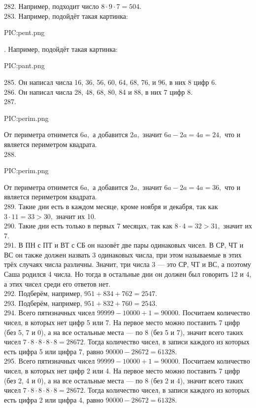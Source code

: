 282. Например, подходит число $8\cdot9\cdot7=504.$\\
283. Например, подойдёт такая картинка:
\begin{center}
{{PIC:pent.png}}
\end{center}\newpage
{}. Например, подойдёт такая картинка:
\begin{center}
{{PIC:pant.png}}
\end{center}
285. Он написал числа 16, 36, 56, 60, 64, 68, 76, и 96, в них 8 цифр 6.\\
286. Он написал числа 28, 48, 68, 80, 84 и 88, в них 7 цифр 8.\\
287. \begin{center}
{{PIC:perim.png}}
\end{center}
От периметра отнимется $6a,$ а добавится $2a,$ значит $6a-2a=4a=24,$ что и является периметром квадрата.\\
288. \begin{center}
{{PIC:perim.png}}
\end{center}
От периметра отнимется $6a,$ а добавится $2a,$ значит $6a-2a=4a=36,$ что и является периметром квадрата.\\
289. Такие дни есть в каждом месяце, кроме ноября и декабря, так как $3\cdot11=33>30,$ значит их 10.\\
290. Такие дни есть только в первых 7 месяцах, так как $8\cdot4=32>31,$ значит их 7.\\
291. В ПН с ПТ и ВТ с СБ он назовёт две пары одинаковых чисел. В СР, ЧТ и ВС он также должен назвать 3 одинаковых числа, при этом называемые в этих трёх случаях числа различны. Значит, три числа 3 --- это СР, ЧТ и ВС, а поэтому Саша родился 4 числа. Но тогда в остальные дни он должен был говорить 12 и 4, а этих чисел среди его ответов нет.\\
292. Подберём, например, $951+834+762=2547.$\\
293. Подберём, например, $951+832+760=2543.$\\
294. Всего пятизначных чисел $99999-10000+1=90000.$ Посчитаем количество чисел, в которых нет цифр 5 или 7. На первое место можно поставить 7 цифр (без 5, 7 и 0), а на все остальные места --- по 8 (без 5 и 7), значит всего таких чисел $7\cdot8\cdot8\cdot8\cdot8=28672.$ Тогда количество чисел, в записи каждого из которых есть цифра 5 или цифра 7, равно $90000-28672=61328.$\\
295. Всего пятизначных чисел $99999-10000+1=90000.$ Посчитаем количество чисел, в которых нет цифр 2 или 4. На первое место можно поставить 7 цифр (без 2, 4 и 0), а на все остальные места --- по 8 (без 2 и 4), значит всего таких чисел $7\cdot8\cdot8\cdot8\cdot8=28672.$ Тогда количество чисел, в записи каждого из которых есть цифра 2 или цифра 4, равно $90000-28672=61328.$\\

